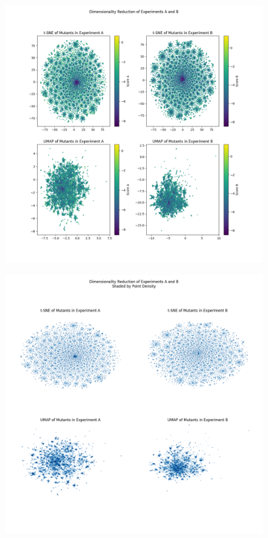 \documentclass[16pt]{article}
\begin{document}
\begin{figure}
	\includegraphics[width=\textwidth]{img/dimred-plt.png}
	\caption{\label{dimredplt}}
\end{figure}
\begin{figure}
	\includegraphics[width=\textwidth]{img/dimred-ds.png}
	\caption{\label{dimredds}}
\end{figure}
\end{document}
